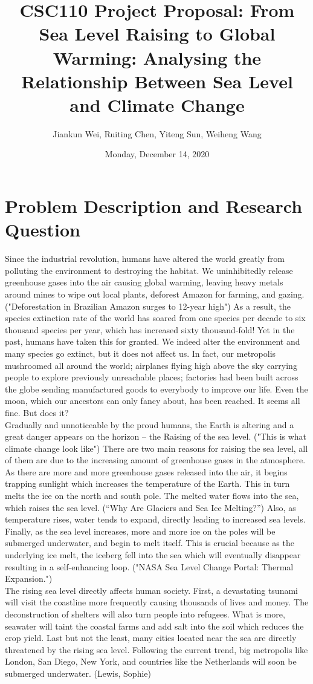 \documentclass[fontsize=11pt]{article}
\title{CSC110 Project Proposal: From Sea Level Raising to Global Warming: Analysing the Relationship Between Sea Level and Climate Change}
\author{Jiankun Wei, Ruiting Chen, Yiteng Sun, Weiheng Wang}
\date{Monday, December 14, 2020}
\begin{document}
    \maketitle

    \section*{Problem Description and Research Question}

    Since the industrial revolution, humans have altered the world greatly from polluting the environment to destroying the habitat. We uninhibitedly release greenhouse gases into the air causing global warming, leaving heavy metals around mines to wipe out local plants, deforest Amazon for farming, and gazing. ("Deforestation in Brazilian Amazon surges to 12-year high") As a result, the species extinction rate of the world has soared from one species per decade to six thousand species per year, which has increased sixty thousand-fold! Yet in the past, humans have taken this for granted. We indeed alter the environment and many species go extinct, but it does not affect us. In fact, our metropolis mushroomed all around the world; airplanes flying high above the sky carrying people to explore previously unreachable places; factories had been built across the globe sending manufactured goods to everybody to improve our life. Even the moon, which our ancestors can only fancy about, has been reached. It seems all fine. But does it?\\
    Gradually and unnoticeable by the proud humans, the Earth is altering and a great danger appears on the horizon -- the Raising of the sea level. ("This is what climate change look like") There are two main reasons for raising the sea level, all of them are due to the increasing amount of greenhouse gases in the atmosphere. As there are more and more greenhouse gases released into the air, it begins trapping sunlight which increases the temperature of the Earth. This in turn melts the ice on the north and south pole. The melted water flows into the sea, which raises the sea level. (“Why Are Glaciers and Sea Ice Melting?”) Also, as temperature rises, water tends to expand, directly leading to increased sea levels. Finally, as the sea level increases, more and more ice on the poles will be submerged underwater, and begin to melt itself. This is crucial because as the underlying ice melt, the iceberg fell into the sea which will eventually disappear resulting in a self-enhancing loop. ("NASA Sea Level Change Portal: Thermal Expansion.")\\
    The rising sea level directly affects human society. First, a devastating tsunami will visit the coastline more frequently causing thousands of lives and money. The deconstruction of shelters will also turn people into refugees. What is more, seawater will taint the coastal farms and add salt into the soil which reduces the crop yield. Last but not the least, many cities located near the sea are directly threatened by the rising sea level. Following the current trend, big metropolis like London, San Diego, New York, and countries like the Netherlands will soon be submerged underwater. (Lewis, Sophie)\\
\end{document}
